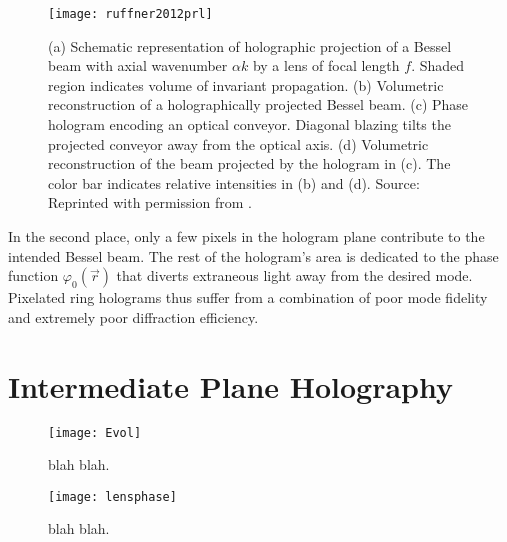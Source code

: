 \begin{figure}[t!]
  \centering
  \texttt{[image: ruffner2012prl]}
  \caption{(a) Schematic representation of holographic projection of a Bessel beam with axial wavenumber $\alpha k$ by a lens of focal length $f$. Shaded region indicates volume of invariant propagation. (b) Volumetric reconstruction of a holographically projected Bessel beam. (c) Phase hologram encoding an optical conveyor. Diagonal blazing tilts the projected conveyor away from the optical axis. (d) Volumetric reconstruction of the beam projected by the hologram in (c). The color bar indicates relative intensities in (b) and (d). Source: Reprinted with permission from \cite{ruffner12a}.}
  \label{fig:previous bessel hologram}
\end{figure}


In the second place, only a few pixels in
the hologram plane contribute to the intended Bessel beam.
The rest of the hologram's area is dedicated to the
phase function $\varphi_0(\vec{r})$ that diverts
extraneous light away from the desired mode.
Pixelated ring holograms thus suffer from a combination of
poor mode fidelity and extremely poor diffraction efficiency.






\section{Intermediate Plane Holography}


\begin{figure}[t!]
  \centering
  \texttt{[image: Evol]}
  \caption{blah blah.}
  \label{fig:bhal}
\end{figure}

\begin{figure}[t!]
  \centering
  \texttt{[image: lensphase]}
  \caption{blah blah.}
  \label{fig:blah blah}
\end{figure}



